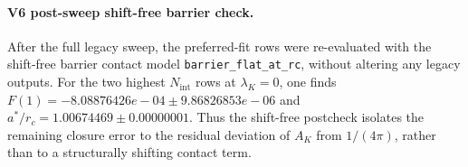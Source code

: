 \paragraph{V6 post-sweep shift-free barrier check.}
After the full legacy sweep, the preferred-fit rows were re-evaluated with the shift-free barrier contact model \texttt{barrier\_flat\_at\_rc}, without altering any legacy outputs. For the two highest $N_{\mathrm{int}}$ rows at $\lambda_K=0$, one finds $F(1) = -8.08876426e-04 \pm 9.86826853e-06$ and $a^*/r_c = 1.00674469 \pm 0.00000001$. Thus the shift-free postcheck isolates the remaining closure error to the residual deviation of $A_K$ from $1/(4\pi)$, rather than to a structurally shifting contact term.

